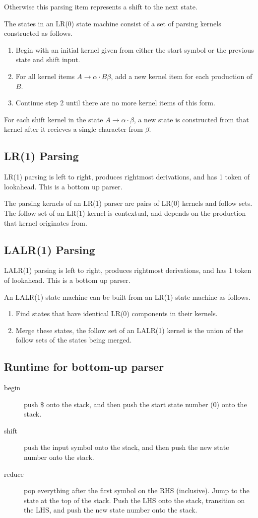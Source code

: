 \documentclass[landscape]{cheat}
\begin{document}
\begin{multicols}{3}
Otherwise this parsing item represents a shift to the next state.

The states in an LR(0) state machine consist of a set of parsing kernels constructed as follows.
\begin{enumerate}
    \item Begin with an initial kernel given from either the start symbol or the previous state and shift input.
    \item For all kernel items $A \rightarrow \alpha \cdot B \beta$, add a new kernel item for each production of $B$.
    \item Continue step 2 until there are no more kernel items of this form.
\end{enumerate}
For each shift kernel in the state $A \rightarrow \alpha \cdot \beta$, a new state is constructed from that kernel after it recieves a single character from $\beta$.

\subsection{LR(1) Parsing}
LR(1) parsing is left to right, produces rightmost derivations, and has 1 token of lookahead. This is a bottom up parser.

The parsing kernels of an LR(1) parser are pairs of LR(0) kernels and follow sets. The follow set of an LR(1) kernel is contextual, and depends on the production that kernel originates from.

\subsection{LALR(1) Parsing}
LALR(1) parsing is left to right, produces rightmost derivations, and has 1 token of lookahead. This is a bottom up parser.

An LALR(1) state machine can be built from an LR(1) state machine as follows.
\begin{enumerate}
    \item Find states that have identical LR(0) components in their kernels.
    \item Merge these states, the follow set of an LALR(1) kernel is the union of the follow sets of the states being merged.
\end{enumerate}

\subsection{Runtime for bottom-up parser}
\begin{description}
\item[begin] push $\$$ onto the stack, and then push the start state number (0) onto the stack.
\item[shift] push the input symbol onto the stack, and then push the new state number onto the stack.
\item[reduce] pop everything after the first symbol on the RHS (inclusive). Jump to the state at the top of the stack. Push the LHS onto the stack, transition on the LHS, and push the new state number onto the stack.
\end{description}


\end{multicols}
\end{document}
